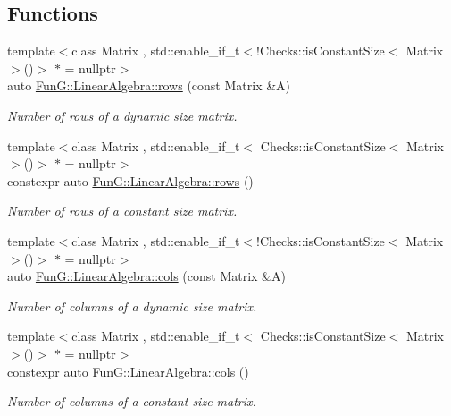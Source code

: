 \subsection*{Functions}
\begin{DoxyCompactItemize}
\item 
{\footnotesize template$<$class Matrix , std\-::enable\-\_\-if\-\_\-t$<$!\-Checks\-::is\-Constant\-Size$<$ Matrix $>$()$>$ $\ast$  = nullptr$>$ }\\auto \hyperlink{namespaceFunG_1_1LinearAlgebra_abd3afa2fcd2194787342b2662cfa9f5a}{Fun\-G\-::\-Linear\-Algebra\-::rows} (const Matrix \&A)
\begin{DoxyCompactList}\small\item\em Number of rows of a dynamic size matrix. \end{DoxyCompactList}\item 
{\footnotesize template$<$class Matrix , std\-::enable\-\_\-if\-\_\-t$<$ Checks\-::is\-Constant\-Size$<$ Matrix $>$()$>$ $\ast$  = nullptr$>$ }\\constexpr auto \hyperlink{namespaceFunG_1_1LinearAlgebra_ab401cccb1259e724bf37d2e198e2ca3d}{Fun\-G\-::\-Linear\-Algebra\-::rows} ()
\begin{DoxyCompactList}\small\item\em Number of rows of a constant size matrix. \end{DoxyCompactList}\item 
{\footnotesize template$<$class Matrix , std\-::enable\-\_\-if\-\_\-t$<$!\-Checks\-::is\-Constant\-Size$<$ Matrix $>$()$>$ $\ast$  = nullptr$>$ }\\auto \hyperlink{namespaceFunG_1_1LinearAlgebra_ae981b8bee32eea3ce87f41874835c9c1}{Fun\-G\-::\-Linear\-Algebra\-::cols} (const Matrix \&A)
\begin{DoxyCompactList}\small\item\em Number of columns of a dynamic size matrix. \end{DoxyCompactList}\item 
{\footnotesize template$<$class Matrix , std\-::enable\-\_\-if\-\_\-t$<$ Checks\-::is\-Constant\-Size$<$ Matrix $>$()$>$ $\ast$  = nullptr$>$ }\\constexpr auto \hyperlink{namespaceFunG_1_1LinearAlgebra_a9eb685419fe4c5f91619d5aa0f973320}{Fun\-G\-::\-Linear\-Algebra\-::cols} ()
\begin{DoxyCompactList}\small\item\em Number of columns of a constant size matrix. \end{DoxyCompactList}\end{DoxyCompactItemize}
